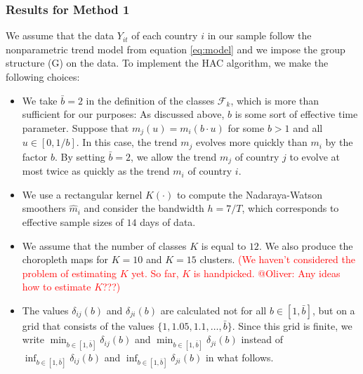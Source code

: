 \documentclass[a4paper,12pt]{article}
\numberwithin{equation}{section}
\begin{document}
\subsubsection{Results for Method 1}\label{subsubsec:method1}


We assume that the data $Y_{it}$ of each country $i$ in our sample follow the nonparametric trend model from equation \eqref{eq:model} and we impose the group structure (G) on the data. 
To implement the HAC algorithm, we make the following choices:
\begin{itemize}[leftmargin=0.6cm]
\item We take $\bar{b} = 2$ in the definition of the classes $\mathcal{F}_k$, which is more than sufficient for our purposes: As discussed above, $b$ is some sort of effective time parameter. Suppose that $m_j(u) = m_i(b \cdot u)$ for some $b > 1$ and all $u \in [0,1/b]$. In this case, the trend $m_j$ evolves more quickly than $m_i$ by the factor $b$. By setting $\bar{b} = 2$, we allow the trend $m_j$ of country $j$ to evolve at most twice as quickly as the trend $m_i$ of country $i$.  
\item We use a rectangular kernel $K(\cdot)$ to compute the Nadaraya-Watson smoothers $\hat{m}_{i}$ and consider the bandwidth $h = 7/T$, which corresponds to effective sample sizes of $14$ days of data. 
\item We assume that the number of classes $K$ is equal to $12$. We also produce the choropleth maps for $K=10$ and $K = 15$ clusters. \textcolor{red}{(We haven't considered the problem of estimating $K$ yet. So far, $K$ is handpicked. @Oliver: Any ideas how to estimate $K$???)}
\item The values $\delta_{ij}(b)$ and $\delta_{ji}(b)$ are calculated not for all $b\in [1, \bar{b}]$, but on a grid that consists of the values $\{1, 1.05, 1.1, \ldots, \bar{b}\}$. Since this grid is finite, we write $\min_{b \in [1, \bar{b}]} \delta_{ij}(b)$ and $\min_{b \in [1, \bar{b}]} \delta_{ji}(b)$ instead of $\inf_{b \in [1, \bar{b}]} \delta_{ij}(b)$ and $\inf_{b \in [1, \bar{b}]} \delta_{ji}(b)$ in what follows.
\end{itemize}
\end{document}
